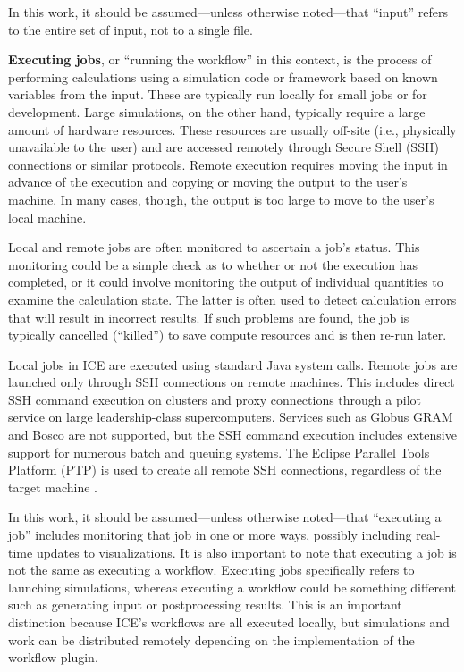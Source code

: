 In this work, it should be assumed---unless otherwise noted---that
``input'' refers to the entire set of input, not to a single file.

\textbf{Executing jobs}, or ``running the workflow'' in this context, is
the process of performing calculations using a simulation code or
framework based on known variables from the input. These are typically run locally for small jobs or for development. Large
simulations, on the other hand, typically require a large amount of
hardware resources. These resources are usually off-site (i.e.,
physically unavailable to the user) and are accessed remotely
through Secure Shell (SSH) connections or similar protocols. Remote
execution requires moving the input in advance of the execution and
copying or moving the output to the user's machine. In many cases,
though, the output is too large to move to the user's local machine.

Local and remote jobs are often monitored to ascertain a job's status.
This monitoring could be a simple check as to whether or not the execution
has completed, or it could involve monitoring the output of individual
quantities to examine the calculation state. The latter is often used to
detect calculation errors that will result in incorrect results. If such
problems are found, the job is typically cancelled (``killed'') to save
compute resources and is then re-run later.

Local jobs in ICE are executed using standard Java system calls. Remote jobs
are launched only through SSH connections on remote machines. This includes
direct SSH command execution on clusters and proxy connections through a pilot
service on large leadership-class supercomputers. Services such as Globus GRAM
and Bosco are not supported, but the SSH command execution includes extensive
support for numerous batch and queuing systems. The Eclipse Parallel Tools
Platform (PTP) is used to create all remote SSH connections, regardless of the
target machine \cite{tibbitts_integrated_2009}.

In this work, it should be assumed---unless otherwise noted---that
``executing a job'' includes monitoring that job in one or more ways,
possibly including real-time updates to visualizations. It is also important to
note that executing a job is not the same as executing a workflow. Executing
jobs specifically refers to launching simulations, whereas executing a workflow
could be something different such as generating input or postprocessing
results. This is an important distinction because ICE's workflows are all
executed locally, but simulations and work can be distributed remotely
depending on the implementation of the workflow plugin.

